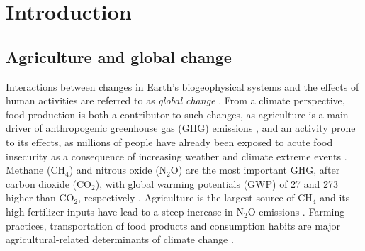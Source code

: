 \chapter*{\Huge Introduction}
\thispagestyle{thesis} %

\section*{Agriculture and global change}

Interactions between changes in Earth's biogeophysical systems and the effects of human activities are referred to as \textit{global change} \citep{national2001global}. From a climate perspective, food production is both a contributor to such changes, as agriculture is a main driver of anthropogenic greenhouse gas (GHG) emissions \citep{lenka2015, chataut2023}, and an activity prone to its effects, as millions of people have already been exposed to acute food insecurity as a consequence of increasing weather and climate extreme events \citep{fao2022b}. Methane (CH$_{4}$) and nitrous oxide (N$_{2}$O) are the most important GHG, after carbon dioxide (CO$_{2}$), with global warming potentials (GWP) of 27 and 273 higher than CO$_{2}$, respectively \citep{IPCC2021}. Agriculture is the largest source of CH$_{4}$ and its high fertilizer inputs have lead to a steep increase in N$_{2}$O emissions \citep{IPCC2007}. Farming practices, transportation of food products and consumption habits are major agricultural-related determinants of climate change \citep{balogh2020}.\\ %

